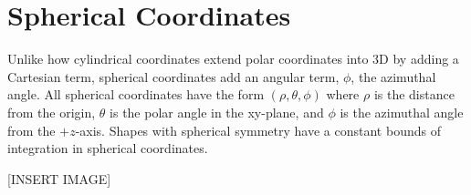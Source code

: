 \section{Spherical Coordinates}
\noindent
Unlike how cylindrical coordinates extend polar coordinates into 3D by adding a Cartesian term, spherical coordinates add an angular term, $\phi$, the azimuthal angle. All spherical coordinates have the form $(\rho,\theta,\phi)$ where $\rho$ is the distance from the origin, $\theta$ is the polar angle in the xy-plane, and $\phi$ is the azimuthal angle from the $+z$-axis. Shapes with spherical symmetry have a constant bounds of integration in spherical coordinates.

[INSERT IMAGE]


